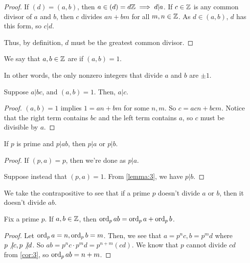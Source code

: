 \documentclass{article}
\begin{document}
\begin{proof}
    If $(d) = (a, b)$, then $a \in (d) = d\mathbb Z \implies d | a$. If $c \in \mathbb Z$ is any common divisor of $a$ and $b$, then $c$ divides $an + bm$ for all $m, n \in \mathbb Z$. As $d \in (a, b)$, $d$ has this form, so $c | d$.

    Thus, by definition, $d$ must be the greatest common divisor.
\end{proof}

\begin{definition}
    We say that $a, b \in \mathbb Z$ are  if $(a, b) = 1$.

    In other words, the only nonzero integers that divide $a$ and $b$ are $\pm 1$.
\end{definition}

\begin{lemma}
    \label{lemma:3}
    Suppose $a | bc$, and $(a, b) = 1$. Then, $a | c$.
\end{lemma}

\begin{proof}
    $(a, b) = 1$ implies $1 = an + bm$ for some $n, m$. So $c = acn + bcm$. Notice that the right term contains $bc$ and the left term contains $a$, so $c$ must be divisible by $a$.
\end{proof}

\begin{corollary}
    \label{cor:3}
    If $p$ is prime and $p | ab$, then $p | a$ or $p | b$.
\end{corollary}

\begin{proof}
    If $(p, a) = p$, then we're done as $p | a$.

    Suppose instead that $(p, a) = 1$. From \ref{lemma:3}, we have $p | b$.
\end{proof}

We take the contrapositive to see that if a prime $p$ doesn't divide $a$ or $b$, then it doesn't divide $ab$.

\begin{proposition}
    Fix a prime $p$. If $a, b \in \mathbb Z$, then $\operatorname{ord}_p ab = \operatorname{ord}_p a + \operatorname{ord}_p b$.
\end{proposition}

\begin{proof}
    Let $\operatorname{ord}_p a = n, \operatorname{ord}_p b = m$. Then, we see that $a = p^nc, b = p^md$ where $p \not \vert c, p \not \vert d$. So $ab = p^nc \cdot p^md = p^{n+m}(cd)$. We know that $p$ cannot divide $cd$ from \ref{cor:3}, so $\operatorname{ord}_p ab = n + m$.
\end{proof}
\end{document}

